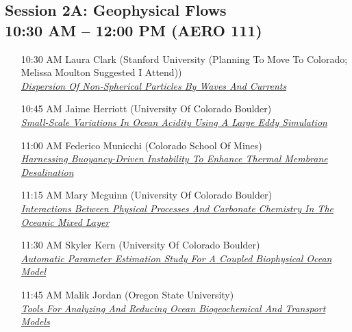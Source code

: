 \subsection*{Session 2A: Geophysical Flows \\ 10:30 AM  -- 12:00 PM (AERO 111)}
\begin{enumerate}
\item [10:30 AM] Laura Clark (Stanford University (Planning To Move To Colorado; Melissa Moulton Suggested I Attend)) \\ \hyperlink{LauraClark}{\it Dispersion Of Non-Spherical Particles By Waves And Currents }
\item [10:45 AM] Jaime Herriott (University Of Colorado Boulder) \\ \hyperlink{JaimeHerriott}{\it Small-Scale Variations In Ocean Acidity Using A Large Eddy Simulation }
\item [11:00 AM] Federico Municchi (Colorado School Of Mines) \\ \hyperlink{FedericoMunicchi}{\it Harnessing Buoyancy-Driven Instability To Enhance Thermal Membrane Desalination }
\item [11:15 AM] Mary Mcguinn (University Of Colorado Boulder) \\ \hyperlink{MaryMcguinn}{\it Interactions Between Physical Processes And Carbonate Chemistry In The Oceanic Mixed Layer }
\item [11:30 AM] Skyler Kern (University Of Colorado Boulder) \\ \hyperlink{SkylerKern}{\it Automatic Parameter Estimation Study For A Coupled Biophysical Ocean Model }
\item [11:45 AM] Malik Jordan (Oregon State University) \\ \hyperlink{MalikJordan}{\it Tools For Analyzing And Reducing Ocean Biogeochemical And Transport Models }
\end{enumerate}
